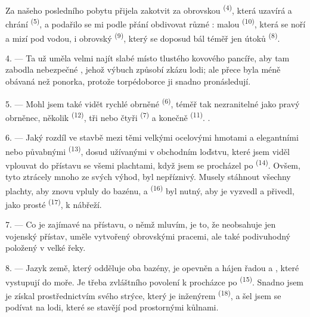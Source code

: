 Za našeho posledního pobytu  přijela zakotvit za obrovskou
 \textsuperscript{(4)}, která uzavírá a chrání 
\textsuperscript{(5)}, a podařilo se mi podle přání obdivovat různé :
malou  \textsuperscript{(10)}, která se noří a mizí pod vodou, i obrovský
 \textsuperscript{(9)}, který se doposud bál téměř jen útoků
 \textsuperscript{(8)}.

\VUsaut{3.0mm}
\VUsaut{3.0mm}

4. --- Ta už uměla velmi  najít slabé místo tlustého kovového pancíře, aby tam
zabodla nebezpečné , jehož výbuch způsobí zkázu lodi; ale přece byla méně
obávaná než ponorka, protože torpédoborce ji snadno pronásledují.

5. --- Mohl jsem také vidět rychlé obrněné  \textsuperscript{(6)}, téměř tak
nezranitelné jako pravý obrněnec, několik  \textsuperscript{(12)}, tři
nebo čtyři  \textsuperscript{(7)} a konečně 
\textsuperscript{(11)}.
.

6. --- Jaký rozdíl ve stavbě mezi těmi velkými ocelovými hmotami a elegantními
 nebo půvabnými  \textsuperscript{(13)},
dosud užívanými v obchodním loďstvu, které jsem viděl vplouvat do přístavu se všemi plachtami,
když jsem se procházel po  \textsuperscript{(14)}. Ovšem, tyto ztrácely mnoho ze
svých výhod,  byl  nepříznivý. Musely stáhnout všechny plachty, aby
znovu vpluly do bazénu, a  \textsuperscript{(16)} byl nutný, aby je
vyzvedl a přivedl, jako prosté  \textsuperscript{(17)}, k nábřeží.

\VUsaut{3.0mm}
\VUsaut{3.0mm}

7. --- Co je zajímavé na přístavu, o němž mluvím, je to, že neobsahuje jen vojenský přístav,
uměle vytvořený obrovskými pracemi, ale také podivuhodný  položený v
 velké řeky.

8. --- Jazyk země, který odděluje oba bazény, je opevněn a hájen řadou  a
, které vystupují do moře. Je třeba zvláštního povolení k procházce po
 \textsuperscript{(15)}. Snadno jsem je získal prostřednictvím svého strýce,
který je inženýrem  \textsuperscript{(18)}, a šel jsem se podívat na lodi,
které se stavějí pod prostornými kůlnami.

